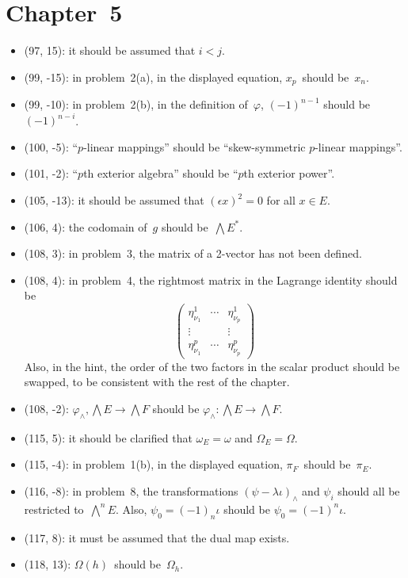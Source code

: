 \documentclass[letterpaper,12pt]{article}
\newcommand{\eprod}{\wedge}
\newcommand{\bigeprod}{\bigwedge}
\begin{document}
\section*{Chapter~5}
\begin{itemize}
\item (97, 15): it should be assumed that \(i<j\).
\item (99, -15): in problem~2(a), in the displayed equation, \(x_p\)~should be~\(x_n\).
\item (99, -10): in problem~2(b), in the definition of~\(\varphi\), \((-1)^{n-1}\) should be \((-1)^{n-i}\).
\item (100, -5): ``\(p\)-linear mappings'' should be ``skew-symmetric \(p\)-linear mappings''.
\item (101, -2): ``\(p\)th exterior algebra'' should be ``\(p\)th exterior power''.
\item (105, -13): it should be assumed that \((\epsilon x)^2=0\) for all \(x\in E\).
\item (106, 4): the codomain of~\(g\) should be~\(\bigwedge E^*\).
\item (108, 3): in problem~3, the matrix of a 2-vector has not been defined.
\item (108, 4): in problem~4, the rightmost matrix in the Lagrange identity should be
\[
\begin{pmatrix}
\eta^1_{\nu_1}&\cdots&\eta^1_{\nu_p}\\
\vdots&&\vdots\\
\eta^p_{\nu_1}&\cdots&\eta^p_{\nu_p}
\end{pmatrix}
\]
Also, in the hint, the order of the two factors in the scalar product should be swapped, to be consistent with the rest of the chapter.
\item (108, -2): \(\varphi_{\eprod},\bigeprod E\to\bigeprod F\) should be \(\varphi_{\eprod}:\bigeprod E\to\bigeprod F\).
\item (115, 5): it should be clarified that \(\omega_E=\omega\) and \(\Omega_E=\Omega\).
\item (115, -4): in problem~1(b), in the displayed equation, \(\pi_F\)~should be~\(\pi_E\).
\item (116, -8): in problem~8, the transformations \((\psi-\lambda\iota)_{\eprod}\) and \(\psi_i\) should all be restricted to~\(\bigeprod^n E\). Also, \(\psi_0=(-1)_n\iota\) should be \(\psi_0=(-1)^n\iota\).
\item (117, 8): it must be assumed that the dual map exists.
\item (118, 13): \(\Omega(h)\)~should be~\(\Omega_h\).

\end{itemize}
\end{document}
